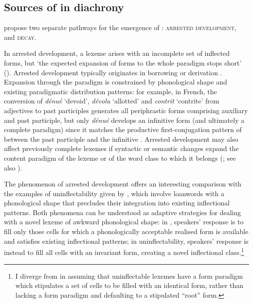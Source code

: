\documentclass[output=paper,colorlinks,citecolor=brown]{langscibook}
\begin{document}
\subsection{Sources of  in diachrony}

\citet{baermancorbett2010} propose two separate pathways for the emergence of : \textsc{arrested development}, and \textsc{decay}.

In arrested development, a lexeme arises with an incomplete set of inflected forms, but `the expected expansion of forms to the whole paradigm stops short' (\citeyear[11]{baermancorbett2010}). Arrested development typically originates in borrowing or derivation \citep[12]{baermancorbett2010}. Expansion through the paradigm is constrained by phonological shape and existing paradigmatic distribution patterns: for example, in French, the conversion of \emph{dénué} `devoid', \emph{dévolu} `allotted' and \emph{contrit} `contrite' from adjectives to past participles generates all periphrastic forms comprising auxiliary and past participle, but only \emph{dénué} develops an infinitive form (and ultimately a complete paradigm) since it matches the productive first-conjugation pattern of  between the past participle and the infinitive \citep[145--146]{bachesher2015}. Arrested development may also affect previously complete lexemes if syntactic or semantic changes expand the content
paradigm of the lexeme or of the word class to which it belongs (\citealt[12--13]{baermancorbett2010}; see also \citealt[63--73]{sims2015}).

The phenomenon of arrested development offers an interesting comparison with the examples of uninflectability given by \citet{spencer2020}, which involve loanwords with a phonological shape that precludes their integration into existing inflectional patterns. Both phenomena can be understood as adaptive strategies for dealing with a novel lexeme of awkward phonological shape: in , speakers' response is to fill only those cells for which a phonologically acceptable realised form is available and satisfies existing inflectional patterns; in uninflectability, speakers' response is instead to fill all cells with an invariant form, creating a novel inflectional class.\footnote{I diverge from \citet{spencer2020} in assuming that uninflectable lexemes have a form paradigm which stipulates a set of cells to be filled with an identical form, rather than lacking a form paradigm and defaulting to a stipulated ``root'' form.}
\end{document}
